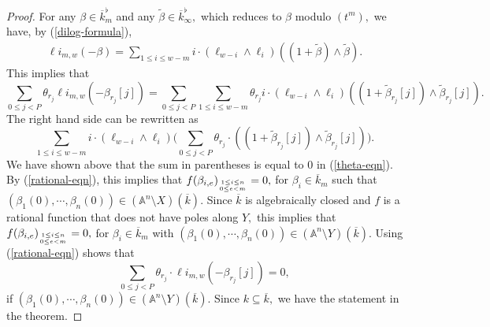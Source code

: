 \documentclass[10pt,a4paper]{amsart}
\begin{document}
\begin{proof}
 
For any  $\beta \in \overline{k}_m ^{\flat}$ and any $\tilde{\beta} \in \overline{k}_{\infty} ^{\flat},$ which  reduces to  $\beta $ modulo $(t^m),$ we have, by (\ref{dilog-formula}),
\begin{align}\label{lifting-indentity-0}
\ell i _{m,w}(-\beta)=\sum_{1 \leq i \leq w - m} i \cdot (\ell_{w - i} \land \ell_i)((1+\tilde{\beta}) \wedge \tilde{\beta}).    
\end{align}
This implies that  
$$
\sum _{0\leq j <P} \theta_{r_j}\ell i _{m,w}(-\beta_{r_j}[j])=\sum _{0\leq j <P} \sum _{1\leq i \leq w-m}\theta_{r_j} i \cdot (\ell_{w - i} \land \ell_i)((1+\tilde{\beta}_{r_j}[j]) \wedge \tilde{\beta}_{r_j}[j]).
$$
The right hand side can be rewritten as 
$$
 \sum _{1\leq i \leq w-m}i \cdot (\ell_{w - i} \land \ell_i)\Big ( \sum _{0\leq j <P}\theta_{r_j}\cdot ((1+\tilde{\beta}_{r_j}[j]) \wedge \tilde{\beta}_{r_j}[j])\Big).
$$
We have shown above that the sum in parentheses is equal to 0 in (\ref{theta-eqn}). By (\ref{rational-eqn}), this implies that $f(\beta_{i,e})_{{1\leq i \leq n} \atop {0\leq e <m}} =0,$ for $\beta_{i} \in \overline{k}_{m}$ such that $(\beta_1(0),\cdots, \beta_{n}(0)) \in (\mathbb{A} ^n \setminus X)(\overline{k}).$ Since $\overline{k}$ is algebraically closed and  $f$ is a rational function that does not have poles along $Y, $ this implies that $f(\beta_{i,e})_{{1\leq i \leq n} \atop {0\leq e <m}} =0,$ for $\beta_{i} \in \overline{k}_{m}$ with $(\beta_1(0),\cdots, \beta_{n}(0)) \in (\mathbb{A} ^n \setminus Y)(\overline{k}).$ Using (\ref{rational-eqn}) shows that 
$$
\sum _{0\leq j <P} \theta_{r_j}\cdot \ell i _{m,w}(-\beta_{r_j}[j])=0,
$$
if $(\beta_{1}(0),\cdots, \beta_{n}(0)) \in (\mathbb{A}^{n}\setminus Y)(\overline{k}).$ Since $k\subseteq \overline{k},$ we have the statement in the theorem. 
\end{proof}
\end{document}
